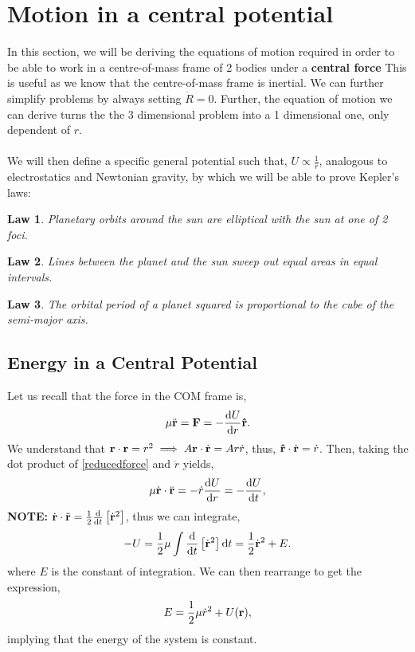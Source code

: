 \documentclass{book}
\newtheorem{klaw}{Law}
\begin{document}
\section{Motion in a central potential}
In this section, we will be deriving the equations of motion required in order to be able to work in a centre-of-mass frame of 2 bodies under a \textbf{central force} This is useful as we know that the centre-of-mass frame is inertial. We can further simplify problems by always setting $\Dot{R} = 0$. Further, the equation of motion we can derive turns the the 3 dimensional problem into a 1 dimensional one, only dependent of $r$.
\\\\
We will then define a specific general potential such that, $U \propto \frac{1}{r}$, analogous to electrostatics and Newtonian gravity, by which we will be able to prove Kepler's laws:
\begin{klaw}
    Planetary orbits around the sun are elliptical with the sun at one of 2 foci.
\end{klaw}
\begin{klaw}
    Lines between the planet and the sun sweep out equal areas in equal intervals.
\end{klaw}
\begin{klaw}
    The orbital period of a planet squared is proportional to the cube of the semi-major axis.
\end{klaw}
\subsection{Energy in a Central Potential}
Let us recall that the force in the COM frame is,
\begin{equation} \label{reducedforce}
    \mu \Ddot{\vb{r}} = \vb{F} = -\dv{U}{r}\vu{r}.
\end{equation}
We understand that $\vb{r}\cdot\vb{r} = r^2 \implies A\vb{r}\cdot\Dot{\vb{r}} = Ar\Dot{r}$, thus, $\vu{r}\cdot\Dot{\vb{r}} = \Dot{r}$. Then, taking the dot product of \eqref{reducedforce} and $\Dot{r}$ yields,
\begin{equation}
    \mu \Dot{\vb{r}}\cdot \Ddot{\vb{r}} = -\Dot{r}\dv{U}{r} = -\dv{U}{t},
\end{equation}
\textbf{NOTE:} $\Dot{\vb{r}} \cdot \Ddot{\vb{r}} = \frac{1}{2}\dv{}{t}\left[\Dot{\vb{r}}^2\right]$, thus we can integrate,
\begin{equation}
    -U = \frac{1}{2}\mu\int\dv{}{t}\left[\Dot{\vb{r}}^2\right]\dd{t} = \frac{1}{2}\Dot{\vb{r}}^2 + E.
\end{equation}
where $E$ is the constant of integration. We can then rearrange to get the expression,
\begin{equation}
    E = \frac{1}{2}\mu\Dot{r}^2 + U(\vb{r}),
\end{equation}
implying that the energy of the system is constant.
\end{document}
